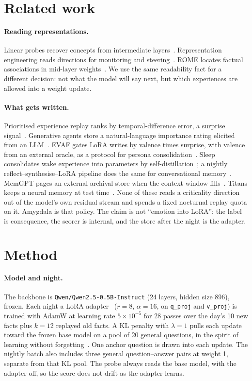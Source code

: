 \documentclass[11pt,a4paper]{article}
\begin{document}
\section{Related work}

\paragraph{Reading representations.}
Linear probes recover concepts from intermediate layers~\cite{alain2016probe}.
Representation engineering reads directions for monitoring and steering~\cite{zou2023repe}.
ROME locates factual associations in mid-layer weights~\cite{meng2022rome}.
We use the same readability fact for a different decision: not what the model will say next, but which experiences are allowed into a weight update.

\paragraph{What gets written.}
Prioritised experience replay ranks by temporal-difference error, a surprise signal~\cite{schaul2015per}.
Generative agents store a natural-language importance rating elicited from an LLM~\cite{park2023generative}.
EVAF gates LoRA writes by valence times surprise, with valence from an external oracle, as a protocol for persona consolidation~\cite{han2026evaf}.
Sleep consolidates wake experience into parameters by self-distillation~\cite{behrouz2026sleep}; a nightly reflect--synthesise--LoRA pipeline does the same for conversational memory~\cite{dennis2026nightly}.
MemGPT pages an external archival store when the context window fills~\cite{packer2023memgpt}.
Titans keeps a neural memory at test time~\cite{behrouz2025titans}.
None of these reads a criticality direction out of the model's own residual stream and spends a fixed nocturnal replay quota on it.
Amygdala is that policy.
The claim is not ``emotion into LoRA'': the label is consequence, the scorer is internal, and the store after the night is the adapter.

\section{Method}
\label{sec:method}

\paragraph{Model and night.}
The backbone is \texttt{Qwen/Qwen2.5-0.5B-Instruct} (24 layers, hidden size 896), frozen.
Each night a LoRA adapter~\cite{hu2021lora} ($r{=}8$, $\alpha{=}16$, on \texttt{q\_proj} and \texttt{v\_proj}) is trained with AdamW at learning rate $5{\times}10^{-5}$ for 28 passes over the day's 10 new facts plus $k{=}12$ replayed old facts.
A KL penalty with $\lambda{=}1$ pulls each update toward the frozen base model on a pool of 20 general questions, in the spirit of learning without forgetting~\cite{li2016lwf}.
One anchor question is drawn into each update.
The nightly batch also includes three general question--answer pairs at weight 1, separate from that KL pool.
The probe always reads the base model, with the adapter off, so the score does not drift as the adapter learns.
\end{document}
